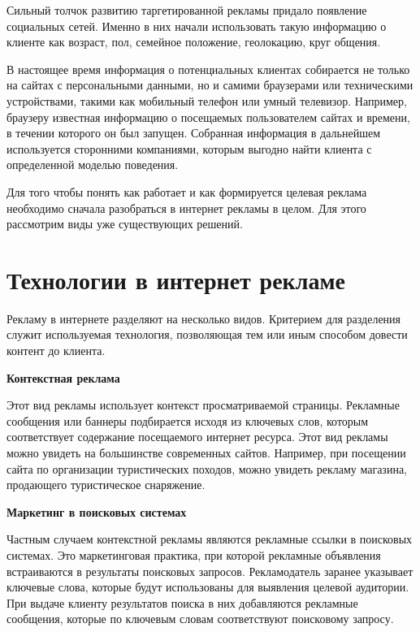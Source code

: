 Сильный толчок развитию таргетированной рекламы придало появление социальных сетей. Именно в них начали использовать такую информацию о клиенте как возраст, пол, семейное положение, геолокацию, круг общения. 

В настоящее время информация о потенциальных клиентах собирается не только на сайтах с персональными данными, но и самими браузерами или техническими устройствами, такими как мобильный телефон или умный телевизор. Например, браузеру известная информацию о посещаемых пользователем сайтах и времени, в течении которого он был запущен. Собранная информация в дальнейшем используется сторонними компаниями, которым выгодно найти клиента с определенной моделью поведения. 

Для того чтобы понять как работает и как формируется целевая реклама необходимо сначала разобраться в интернет рекламы в целом. Для этого рассмотрим виды уже существующих решений.

\section{Технологии в интернет рекламе}

Рекламу в интернете разделяют на несколько видов. Критерием для разделения служит используемая технология, позволяющая тем или иным способом довести контент до клиента.

\textbf{Контекстная реклама}

Этот вид рекламы использует контекст просматриваемой страницы. Рекламные сообщения или баннеры подбирается исходя из ключевых слов, которым соответствует содержание посещаемого интернет ресурса. Этот вид рекламы можно увидеть на большинстве современных сайтов. Например, при посещении сайта по организации туристических походов, можно увидеть рекламу магазина, продающего туристическое снаряжение.
    
\textbf{Маркетинг в поисковых системах}

Частным случаем контекстной рекламы являются рекламные ссылки в поисковых системах. Это маркетинговая практика, при которой рекламные объявления встраиваются в результаты поисковых запросов. Рекламодатель заранее указывает ключевые слова, которые будут использованы для выявления целевой аудитории. При выдаче клиенту результатов поиска в них добавляются рекламные сообщения, которые по ключевым словам соответствуют поисковому запросу.

